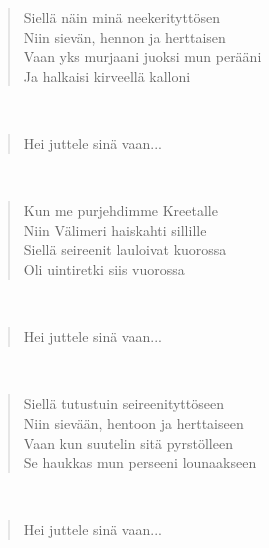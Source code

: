\noindent\begin{minipage}{\linewidth}
\begin{verse}
	Siellä näin minä neekerityttösen\\
	Niin sievän, hennon ja herttaisen\\
	Vaan yks murjaani juoksi mun perääni\\
	Ja halkaisi kirveellä kalloni\\
\end{verse}
\end{minipage}\\[10pt]
\noindent\begin{minipage}{\linewidth}
\begin{verse}
	Hei juttele sinä vaan...\\
\end{verse}
\end{minipage}\\[10pt]
\noindent\begin{minipage}{\linewidth}
\begin{verse}
	Kun me purjehdimme Kreetalle\\
	Niin Välimeri haiskahti sillille\\
	Siellä seireenit lauloivat kuorossa\\
	Oli uintiretki siis vuorossa\\
\end{verse}
\end{minipage}\\[10pt]
\noindent\begin{minipage}{\linewidth}
\begin{verse}
	Hei juttele sinä vaan...\\
\end{verse}
\end{minipage}\\[10pt]
\noindent\begin{minipage}{\linewidth}
\begin{verse}
	Siellä tutustuin seireenityttöseen\\
	Niin sievään, hentoon ja herttaiseen\\
	Vaan kun suutelin sitä pyrstölleen\\
	Se haukkas mun perseeni lounaakseen\\
\end{verse}
\end{minipage}\\[10pt]
\noindent\begin{minipage}{\linewidth}
\begin{verse}
	Hei juttele sinä vaan...\\
\end{verse}
\end{minipage}\\[10pt]
